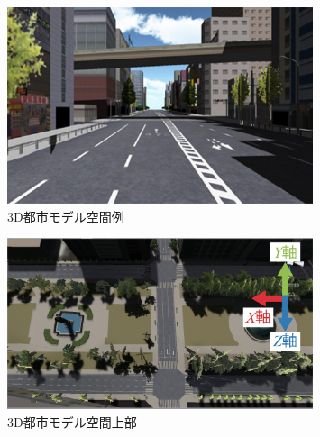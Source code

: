 \begin{figure}[tbp]
	\centering
			\includegraphics[width=0.8\textwidth]{chap2-figure/akihabara3D.eps}
	\caption{3D都市モデル空間例\protect \footnotemark[1]}
	\label{fig:akihabare}
\end{figure}

\begin{figure}[tbp]
	\centering
			\includegraphics[width=0.8\textwidth]{chap2-figure/ue.eps}
	\caption{3D都市モデル空間上部\protect \footnotemark[1]}
	\label{fig:ue}
\end{figure}


